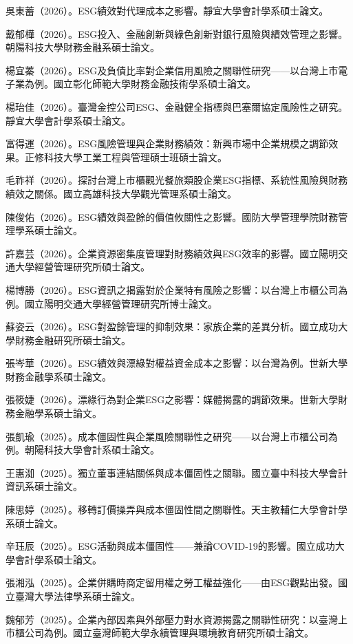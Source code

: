 \documentclass[12pt,a4paper]{article}
\begin{document}
\begin{enumerate}[label={[\arabic*]}, leftmargin=3em]
    \item 吳東蓄（2026）。ESG績效對代理成本之影響。靜宜大學會計學系碩士論文。
    \item 戴郁樺（2026）。ESG投入、金融創新與綠色創新對銀行風險與績效管理之影響。朝陽科技大學財務金融系碩士論文。
    \item 楊宜蓁（2026）。ESG及負債比率對企業信用風險之關聯性研究——以台灣上市電子業為例。國立彰化師範大學財務金融技術學系碩士論文。
    \item 楊珆佳（2026）。臺灣金控公司ESG、金融健全指標與巴塞爾協定風險性之研究。靜宜大學會計學系碩士論文。
    \item 富得運（2026）。ESG風險管理與企業財務績效：新興市場中企業規模之調節效果。正修科技大學工業工程與管理碩士班碩士論文。
    \item 毛祚祥（2026）。探討台灣上市櫃觀光餐旅類股企業ESG指標、系統性風險與財務績效之關係。國立高雄科技大學觀光管理系碩士論文。
    \item 陳俊佑（2026）。ESG績效與盈餘的價值攸關性之影響。國防大學管理學院財務管理學系碩士論文。
    \item 許嘉芸（2026）。企業資源密集度管理對財務績效與ESG效率的影響。國立陽明交通大學經營管理研究所碩士論文。
    \item 楊博勝（2026）。ESG資訊之揭露對於企業特有風險之影響：以台灣上市櫃公司為例。國立陽明交通大學經營管理研究所博士論文。
    \item 蘇姿云（2026）。ESG對盈餘管理的抑制效果：家族企業的差異分析。國立成功大學財務金融研究所碩士論文。
    \item 張岑華（2026）。ESG績效與漂綠對權益資金成本之影響：以台灣為例。世新大學財務金融學系碩士論文。
    \item 張筱婕（2026）。漂綠行為對企業ESG之影響：媒體揭露的調節效果。世新大學財務金融學系碩士論文。
    \item 張凱瑜（2025）。成本僵固性與企業風險關聯性之研究——以台灣上市櫃公司為例。朝陽科技大學會計系碩士論文。
    \item 王惠洳（2025）。獨立董事連結關係與成本僵固性之關聯。國立臺中科技大學會計資訊系碩士論文。
    \item 陳思婷（2025）。移轉訂價操弄與成本僵固性間之關聯性。天主教輔仁大學會計學系碩士論文。
    \item 辛珏辰（2025）。ESG活動與成本僵固性——兼論COVID-19的影響。國立成功大學會計學系碩士論文。
    \item 張湘泓（2025）。企業併購時商定留用權之勞工權益強化——由ESG觀點出發。國立臺灣大學法律學系碩士論文。
    \item 魏郁芳（2025）。企業內部因素與外部壓力對水資源揭露之關聯性研究：以臺灣上市櫃公司為例。國立臺灣師範大學永續管理與環境教育研究所碩士論文。

\end{enumerate}
\end{document}
